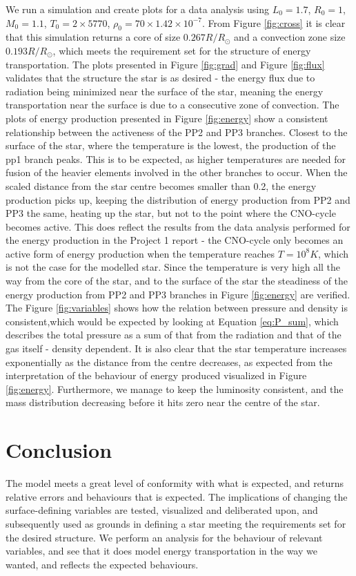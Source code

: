 \documentclass[10pt, nofootinbib, twocolumn]{revtex4-1}
\begin{document}
\newpage
We run a simulation and create plots for a data analysis using  $L_0=1.7$, $R_0=1$, $M_0=1.1$, $T_0=2\times5770$, $\rho_0=70\times1.42\times 10^{-7}$. From Figure \ref{fig:cross} it is clear that this simulation returns a core of size $0.267R/R_\odot$ and a convection zone size $0.193R/R_\odot$, which meets the requirement set for the structure of energy transportation. The plots presented in Figure \ref{fig:grad} and Figure \ref{fig:flux} validates that the structure the star is as desired - the energy flux due to radiation being minimized near the surface of the star, meaning the energy transportation near the surface is due to a consecutive zone of convection. The plots of energy production presented in Figure \ref{fig:energy} show a consistent relationship between the activeness of the PP2 and PP3 branches. Closest to the surface of the star, where the temperature is the lowest, the production of the pp1 branch peaks. This is to be expected, as higher temperatures are needed for fusion of the heavier elements involved in the other branches to occur. When the scaled distance from the star centre becomes smaller than 0.2, the energy production picks up, keeping the distribution of energy production from PP2 and PP3 the same, heating up the star, but not to the point where the CNO-cycle becomes active. This does reflect the results from the data analysis performed for the energy production in the Project 1 report - the  CNO-cycle only becomes an active form of energy production when the temperature reaches $T=10^8K$, which is not the case for the modelled star. Since the temperature is very high all the way from the core of the star, and to the surface of the star the steadiness of the energy production from PP2 and PP3 branches in Figure \ref{fig:energy} are verified. \\


\newpage
The Figure \ref{fig:variables} shows how the relation between pressure and density is consistent,which would be expected by looking at Equation \eqref{eq:P_sum}, which describes the total pressure as a sum of that from the radiation and that of the gas itself - density dependent. It is also clear that the star temperature increases exponentially as the distance from the centre decreases, as expected from the interpretation of the behaviour of energy produced visualized in Figure \ref{fig:energy}. Furthermore, we manage to keep the luminosity consistent, and the mass distribution decreasing before it hits zero near the centre of the star.


\section{Conclusion}
The model meets a great level of conformity with what is expected, and returns relative errors and behaviours that is expected. The implications of changing the surface-defining variables are tested, visualized and deliberated upon, and subsequently used as grounds in defining a star meeting the requirements set for the desired structure. We perform an analysis for the behaviour of relevant variables, and see that it does model energy transportation in the way we wanted, and reflects the expected behaviours. \\
\end{document}
